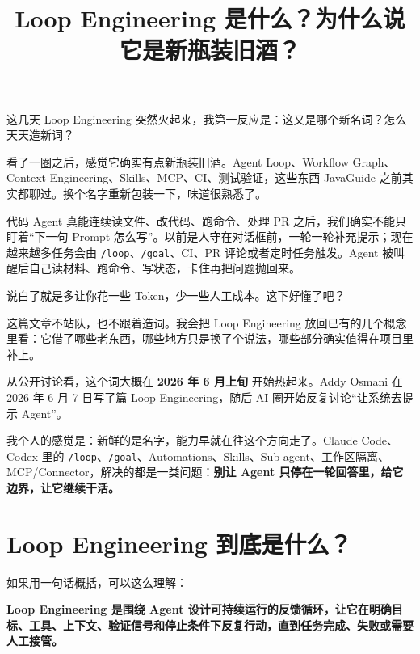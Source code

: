 \documentclass[10pt,a4paper]{ctexart}
\begin{document}
\title{Loop Engineering 是什么？为什么说它是新瓶装旧酒？}
\date{}
\maketitle

这几天 Loop Engineering 突然火起来，我第一反应是：这又是哪个新名词？怎么天天造新词？



看了一圈之后，感觉它确实有点新瓶装旧酒。Agent Loop、Workflow Graph、Context Engineering、Skills、MCP、CI、测试验证，这些东西 JavaGuide 之前其实都聊过。换个名字重新包装一下，味道很熟悉了。



代码 Agent 真能连续读文件、改代码、跑命令、处理 PR 之后，我们确实不能只盯着“下一句 Prompt 怎么写”。以前是人守在对话框前，一轮一轮补充提示；现在越来越多任务会由 \texttt{/loop}、\texttt{/goal}、CI、PR 评论或者定时任务触发。Agent 被叫醒后自己读材料、跑命令、写状态，卡住再把问题抛回来。



说白了就是多让你花一些 Token，少一些人工成本。这下好懂了吧？



这篇文章不站队，也不跟着造词。我会把 Loop Engineering 放回已有的几个概念里看：它借了哪些老东西，哪些地方只是换了个说法，哪些部分确实值得在项目里补上。



从公开讨论看，这个词大概在 \textbf{2026 年 6 月上旬} 开始热起来。Addy Osmani 在 2026 年 6 月 7 日写了篇 Loop Engineering，随后 AI 圈开始反复讨论“让系统去提示 Agent”。



我个人的感觉是：新鲜的是名字，能力早就在往这个方向走了。Claude Code、Codex 里的 \texttt{/loop}、\texttt{/goal}、Automations、Skills、Sub-agent、工作区隔离、MCP/Connector，解决的都是一类问题：\textbf{别让 Agent 只停在一轮回答里，给它边界，让它继续干活。}



\section{Loop Engineering 到底是什么？}


如果用一句话概括，可以这么理解：



\textbf{Loop Engineering 是围绕 Agent 设计可持续运行的反馈循环，让它在明确目标、工具、上下文、验证信号和停止条件下反复行动，直到任务完成、失败或需要人工接管。}
\end{document}
